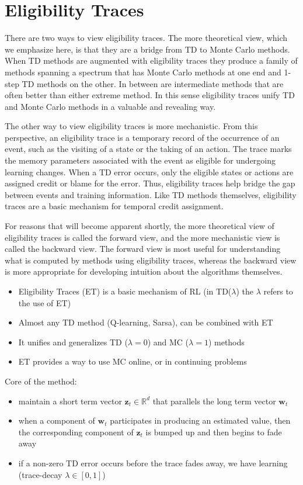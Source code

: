 \documentclass[sutton_barto_notes.tex]{subfiles}
\begin{document}
\newpage
\section{Eligibility Traces}

There are two ways to view eligibility traces. The more theoretical view, which we emphasize here, is that they are a bridge from TD to Monte Carlo methods. When TD methods are augmented with eligibility traces they produce a family of methods spanning a spectrum that has Monte Carlo methods at one end and 1-step TD methods on the other. In between are intermediate methods that are often better than either extreme method. In this sense eligibility traces unify TD and Monte Carlo methods in a valuable and revealing way.

The other way to view eligibility traces is more mechanistic. From this perspective, an eligibility trace is a temporary record of the occurrence of an event, such as the visiting of a state or the taking of an action. The trace marks the memory parameters associated with the event as eligible for undergoing learning changes. When a TD error occurs, only the eligible states or actions are assigned credit or blame for the error. Thus, eligibility traces help bridge the gap between events and training information. Like TD methods themselves, eligibility traces are a basic mechanism for temporal credit assignment.

For reasons that will become apparent shortly, the more theoretical view of eligibility traces is called the forward view, and the more mechanistic view is called the backward view. The forward view is most useful for understanding what is computed by methods using eligibility traces, whereas the backward view is more appropriate for developing intuition about the algorithms themselves. 

\newpage
\begin{itemize}
\item Eligibility Traces (ET) is a basic mechanism of RL (in TD($\lambda$) the $\lambda$ refers to the use of ET) 
\item Almost any TD method (Q-learning, Sarsa), can be combined with ET 
\item It unifies and generalizes TD ($\lambda = 0$) and MC ($\lambda = 1$) methods 
\item ET provides a way to use MC online, or in continuing problems 
\end{itemize}

 Core of the method: 
\begin{itemize}
\item maintain a short term vector $\mathbf{z}_t \in \mathbb{R}^d$ that parallels the long term vector $\mathbf{w}_t$ 
\item when a component of $\mathbf{w}_t$ participates in producing an estimated value, then the corresponding component of $\mathbf{z}_t$ is bumped up and then begins to fade away 
\item if a non-zero TD error occurs before the trace fades away, we have learning (trace-decay $\lambda \in [0, 1]$) 
\end{itemize}
\end{document}
